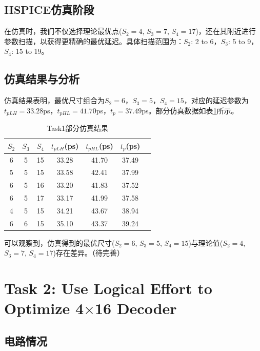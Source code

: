 \documentclass[UTF8,12pt,a4paper]{ctexart}
\begin{document}
\subsection{HSPICE仿真阶段}

在仿真时，我们不仅选择理论最优点($S_2 = 4$, $S_3 = 7$, $S_4 = 17$)，还在其附近进行参数扫描，以获得更精确的最优延迟。具体扫描范围为：$S_2$: 2 to 6，$S_3$: 5 to 9，$S_4$: 15 to 19。

\subsection{仿真结果与分析}

仿真结果表明，最优尺寸组合为$S_2 = 6$，$S_3 = 5$，$S_4 = 15$，对应的延迟参数为$t_{pLH} = 33.28$ps，$t_{pHL} = 41.70$ps，$t_p = 37.49$ps。部分仿真数据如表\ref{tab:task1_results}所示。

\begin{table}[htbp]
\centering
\caption{Task1部分仿真结果}
\label{tab:task1_results}
\begin{tabular}{|c|c|c|c|c|c|c|}
\hline
$S_2$ & $S_3$ & $S_4$ & $t_{pLH}$(ps) & $t_{pHL}$(ps) & $t_p$(ps) \\
\hline
6 & 5 & 15 & 33.28 & 41.70 & 37.49 \\
5 & 5 & 15 & 33.58 & 42.41 & 37.99 \\
6 & 5 & 16 & 33.20 & 41.83 & 37.52 \\
6 & 5 & 17 & 33.17 & 41.99 & 37.58 \\
4 & 5 & 15 & 34.21 & 43.67 & 38.94 \\
6 & 6 & 15 & 35.10 & 43.37 & 39.24 \\
\hline
\end{tabular}
\end{table}

可以观察到，仿真得到的最优尺寸($S_2 = 6$, $S_3 = 5$, $S_4 = 15$)与理论值($S_2 = 4$, $S_3 = 7$, $S_4 = 17$)存在差异。（待完善）


\section{Task 2: Use Logical Effort to Optimize 4$\times$16 Decoder}

\subsection{电路情况}
\end{document}
